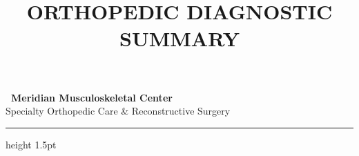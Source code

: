 \documentclass[10pt,a4paper]{article}
\title{
  \vspace{-1.5cm}
  \color{medprimary}
  \bfseries\fontsize{22}{26}\selectfont ORTHOPEDIC DIAGNOSTIC SUMMARY
  \vspace{0.2cm}
}
\author{}
\date{}
\begin{document}
\begin{center}
  {\color{medprimary}\Huge\bfseries \faBriefcaseMedical\ Meridian Musculoskeletal Center} \\
  \vspace{0.1cm}
  {\color{gray}\fontsize{11}{13}\selectfont Specialty Orthopedic Care \& Reconstructive Surgery} \\
  \vspace{0.2cm}
  \hrule height 1.5pt
\end{center}

\vspace{0.3cm}






\newpage


\end{document}
